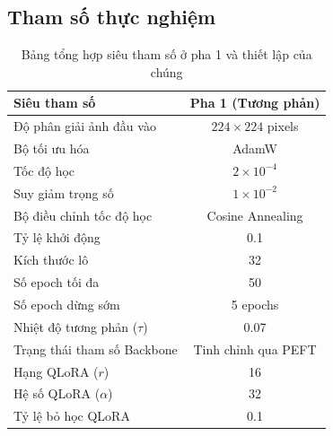 \subsection{Tham số thực nghiệm}
\begin{table}[htbp]
\centering
\begin{tabular}{|l|c|}
\hline
\textbf{Siêu tham số}        & \textbf{Pha 1 (Tương phản)}  \\ \hline
Độ phân giải ảnh đầu vào     & $224 \times 224$ pixels      \\ \hline
Bộ tối ưu hóa                & AdamW                        \\ \hline
Tốc độ học                   & $2 \times 10^{-4}$           \\ \hline
Suy giảm trọng số            & $1 \times 10^{-2}$           \\ \hline
Bộ điều chỉnh tốc độ học     & Cosine Annealing             \\ \hline
Tỷ lệ khởi động              & 0.1                          \\ \hline
Kích thước lô                & 32                           \\ \hline
Số epoch tối đa              & 50                           \\ \hline
Số epoch dừng sớm            & 5 epochs                     \\ \hline
Nhiệt độ tương phản ($\tau$) & 0.07                         \\ \hline
Trạng thái tham số Backbone  & Tinh chỉnh qua PEFT          \\ \hline
Hạng QLoRA ($r$)             & 16                           \\ \hline
Hệ số QLoRA ($\alpha$)       & 32                           \\ \hline
Tỷ lệ bỏ học QLoRA           & 0.1                          \\ \hline
\end{tabular}
\caption{Bảng tổng hợp siêu tham số ở pha 1 và thiết lập của chúng}
\label{tab:hyperparameters_phase1}
\end{table}

